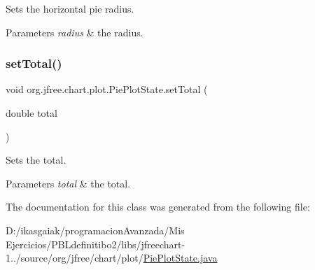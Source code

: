 Sets the horizontal pie radius.


\begin{DoxyParams}{Parameters}
{\em radius} & the radius. \\
\hline
\end{DoxyParams}
\mbox{\label{classorg_1_1jfree_1_1chart_1_1plot_1_1_pie_plot_state_a6ad715e7be012a050e7fd6e3704f510f}} 
\subsubsection{\texorpdfstring{set\+Total()}{setTotal()}}
{\footnotesize\ttfamily void org.\+jfree.\+chart.\+plot.\+Pie\+Plot\+State.\+set\+Total (\begin{DoxyParamCaption}\item[{double}]{total }\end{DoxyParamCaption})}

Sets the total.


\begin{DoxyParams}{Parameters}
{\em total} & the total. \\
\hline
\end{DoxyParams}


The documentation for this class was generated from the following file\+:\begin{DoxyCompactItemize}
\item 
D\+:/ikasgaiak/programacion\+Avanzada/\+Mis Ejercicios/\+P\+B\+Ldefinitibo2/libs/jfreechart-\/1../source/org/jfree/chart/plot/\mbox{\hyperlink{_pie_plot_state_8java}{Pie\+Plot\+State.\+java}}\end{DoxyCompactItemize}
